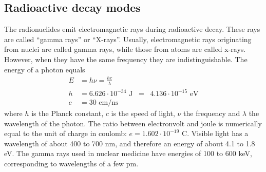 \documentclass[11pt,oneside]{article}
\begin{document}
\subsection{Radioactive decay modes}
The radionuclides emit electromagnetic rays during radioactive decay. These
rays are called ``gamma rays'' or ``X-rays''.  Usually, electromagnetic rays
originating from nuclei are called gamma rays, while those from atoms are
called x-rays. However, when they have the same frequency they are
indistinguishable. The energy of a photon equals
\begin{align}
   E &= h\nu = \frac{hc}{\lambda}\\
   h &= 6.626 \cdot 10^{-34} \mbox{ J} 
   \;\;=\;\; 4.136\cdot 10^{-15} \mbox{ eV}\\
   c &= 30 \mbox{ cm/ns}
\end{align}
where $h$ is the Planck constant, $c$ is the speed of light, $\nu$ the
frequency and $\lambda$ the wavelength of the photon. The ratio
between electronvolt and joule is numerically equal to the unit of
charge in coulomb: $e = 1.602\cdot 10^{-19}$ C. Visible light has a
wavelength of about 400 to 700 nm, and therefore an energy of about
4.1 to 1.8 eV. The gamma rays used in nuclear medicine have energies
of 100 to 600 keV, corresponding to wavelengths of a few pm.
\end{document}
